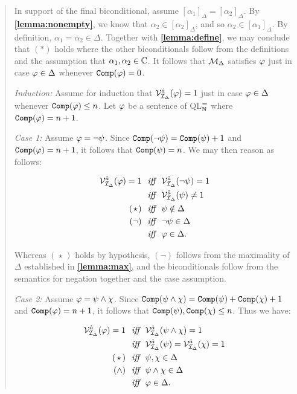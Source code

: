 \begin{quote}
  In support of the final biconditional, assume $[\alpha_1]_\Delta=[\alpha_2]_\Delta$.
  By \textbf{\ref{lemma:nonempty}}, we know that $\alpha_2\in[\alpha_2]_\Delta$, and so $\alpha_2\in[\alpha_1]_\Delta$.
  By definition, $\alpha_1=\alpha_2\in\Delta$.
  Together with \textbf{\ref{lemma:define}}, we may conclude that $(\ast)$ holds where the other biconditionals follow from the definitions and the assumption that $\alpha_1,\alpha_2\in\mathbb{C}$.
  It follows that $\mathcal{M}_\Delta$ satisfies $\varphi$ just in case $\varphi\in\Delta$ whenever $\texttt{Comp}(\varphi)=0$.

  \textit{Induction:}
  Assume for induction that $\mathcal{V}_{\mathcal{I}_\Delta}^{\hat{a}}(\varphi)=1$ just in case $\varphi\in\Delta$ whenever $\texttt{Comp}(\varphi)\leq n$. 
  Let $\varphi$ be a sentence of QL$^=_{\mathbb{N}}$ where $\texttt{Comp}(\varphi)=n+1$.

  \textit{Case 1:}
  Assume $\varphi=\neg\psi$.
  Since $\texttt{Comp}(\neg\psi)=\texttt{Comp}(\psi)+1$ and $\texttt{Comp}(\varphi)=n+1$, it follows that $\texttt{Comp}(\psi)=n$.
  We may then reason as follows:

  \vspace{-.2in}
  \begin{align*}
    \mathcal{V}_{\mathcal{I}_\Delta}^{\hat{a}}(\varphi)=1 &\textit{ ~iff~ } \mathcal{V}_{\mathcal{I}_\Delta}^{\hat{a}}(\neg\psi)=1\\
      &\textit{ ~iff~ } \mathcal{V}_{\mathcal{I}_\Delta}^{\hat{a}}(\psi)\neq 1 \\
      (\hspace{1pt}\star\hspace{1pt}) &\textit{ ~iff~ } \psi\notin\Delta \\
      (\neg) &\textit{ ~iff~ } \neg\psi\in\Delta \\
      &\textit{ ~iff~ } \varphi\in\Delta.
  \end{align*}

  Whereas $(\hspace{1pt}\star\hspace{1pt})$ holds by hypothesis, $(\neg)$ follows from the maximality of $\Delta$ established in \textbf{\ref{lemma:max}}, and the biconditionals follow from the semantics for negation together and the case assumption.

  \textit{Case 2:}
  Assume $\varphi=\psi\wedge\chi$.
  Since $\texttt{Comp}(\psi\wedge\chi)=\texttt{Comp}(\psi)+\texttt{Comp}(\chi)+1$ and  $\texttt{Comp}(\varphi)=n+1$, it follows that $\texttt{Comp}(\psi),\texttt{Comp}(\chi)\leq n$.
  Thus we have:

  \vspace{-.2in}
  \begin{align*}
    \mathcal{V}_{\mathcal{I}_\Delta}^{\hat{a}}(\varphi)=1 &\textit{ ~iff~ } \mathcal{V}_{\mathcal{I}_\Delta}^{\hat{a}}(\psi\wedge\chi)=1\\
      &\textit{ ~iff~ } \mathcal{V}_{\mathcal{I}_\Delta}^{\hat{a}}(\psi)=\mathcal{V}_{\mathcal{I}_\Delta}^{\hat{a}}(\chi)=1 \\
      (\hspace{1.6pt}\star\hspace{1.6pt}) &\textit{ ~iff~ } \psi,\chi\in\Delta \\
      (\wedge) &\textit{ ~iff~ } \psi\wedge\chi\in\Delta \\
      &\textit{ ~iff~ } \varphi\in\Delta.
  \end{align*}


\end{quote}
